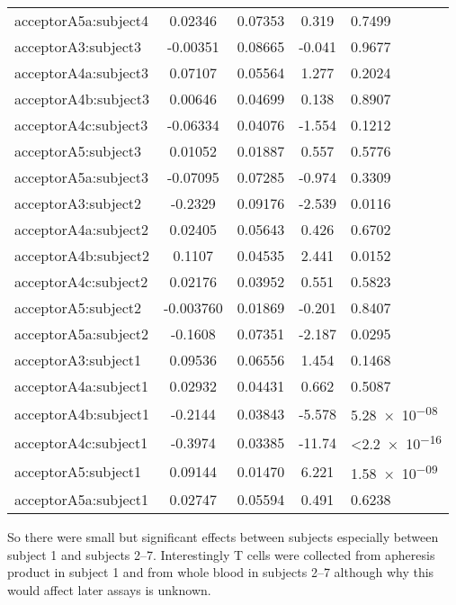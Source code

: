 \documentclass[../../sherrill-Mix_thesis.tex]{subfiles}
\begin{document}
{\begin{tabular}{|l|S[table-format=1.6]|S[table-format=1.5]|S[table-format=2.3]|l|}
acceptorA5a:subject4 & 0.02346    & 0.07353      & 0.319       & \num{0.7499}                  \\ 
acceptorA3:subject3  & -0.00351   & 0.08665      & -0.041      & \num{0.9677}                  \\ 
acceptorA4a:subject3 & 0.07107    & 0.05564      & 1.277       & \num{0.2024}                  \\ 
acceptorA4b:subject3 & 0.00646    & 0.04699      & 0.138       & \num{0.8907}                  \\ 
acceptorA4c:subject3 & -0.06334   & 0.04076      & -1.554      & \num{0.1212}                  \\ 
acceptorA5:subject3  & 0.01052    & 0.01887      & 0.557       & \num{0.5776}                  \\ 
acceptorA5a:subject3 & -0.07095   & 0.07285      & -0.974      & \num{0.3309}                  \\ 
acceptorA3:subject2  & -0.2329    & 0.09176      & -2.539      & \num{0.0116}                  \\ 
acceptorA4a:subject2 & 0.02405    & 0.05643      & 0.426       & \num{0.6702}                  \\ 
acceptorA4b:subject2 & 0.1107     & 0.04535      & 2.441       & \num{0.0152}                  \\ 
acceptorA4c:subject2 & 0.02176    & 0.03952      & 0.551       & \num{0.5823}                  \\ 
acceptorA5:subject2  & -0.003760  & 0.01869      & -0.201      & \num{0.8407}                  \\ 
acceptorA5a:subject2 & -0.1608    & 0.07351      & -2.187      & \num{0.0295}                  \\ 
acceptorA3:subject1  & 0.09536    & 0.06556      & 1.454       & \num{0.1468}                  \\ 
acceptorA4a:subject1 & 0.02932    & 0.04431      & 0.662       & \num{0.5087}                  \\ 
acceptorA4b:subject1 & -0.2144    & 0.03843      & -5.578      & \num{5.28e-08}                \\ 
acceptorA4c:subject1 & -0.3974    & 0.03385      & -11.74      & \textless\num{2.2e-16}        \\ 
acceptorA5:subject1  & 0.09144    & 0.01470      & 6.221       & \num{1.58e-09}                \\ 
acceptorA5a:subject1 & 0.02747    & 0.05594      & 0.491       & \num{0.6238}                  \\ 
\hline
\end{tabular}
}

So there were small but significant effects between subjects especially between subject 1 and subjects 2--7. Interestingly T cells were collected from apheresis product in subject 1 and from whole blood in subjects 2--7 although why this would affect later assays is unknown. 
\end{document}
